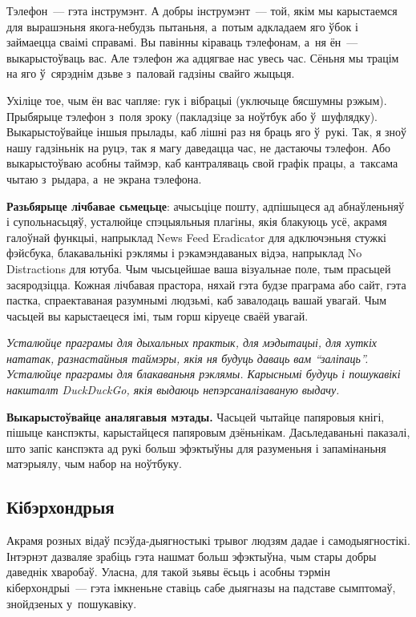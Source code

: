 
Тэлефон~--- гэта інструмэнт. А добры інструмэнт~--- той, якім мы карыстаемся для вырашэньня якога-небудзь пытаньня, а~потым адкладаем яго ўбок і займаецца сваімі справамі. Вы павінны кіраваць тэлефонам, а~ня ён~--- выкарыстоўваць вас. Але тэлефон жа адцягвае нас увесь час. Сёньня мы трацім на яго ў~сярэднім дзьве з~паловай гадзіны свайго жыцьця.

Ухіліце тое, чым ён вас чапляе: гук і вібрацыі (уключыце бясшумны рэжым). Прыбярыце тэлефон з~поля зроку (пакладзіце за ноўтбук або ў~шуфлядку). Выкарыстоўвайце іншыя прылады, каб лішні раз ня браць яго ў~рукі. Так, я зноў нашу гадзіньнік на руцэ, так я магу даведацца час, не дастаючы тэлефон. Або выкарыстоўваю асобны таймэр, каб кантраляваць свой графік працы, а~таксама чытаю з~рыдара, а~не экрана тэлефона.

\textbf{Разьбярыце лічбавае сьмецьце}: ачысьціце пошту, адпішыцеся ад абнаўленьняў і супольнасьцяў, усталюйце спэцыяльныя плагіны, якія блакуюць усё, акрамя галоўнай функцыі, напрыклад News Feed Eradicator для адключэньня стужкі фэйсбука, блакавальнікі рэклямы і рэкамэндаваных відэа, напрыклад No Distractions для ютуба. Чым чысьцейшае ваша візуальнае поле, тым прасьцей засяродзіцца. Кожная лічбавая прастора, няхай гэта будзе праграма або сайт, гэта пастка, спраектаваная разумнымі людзьмі, каб завалодаць вашай увагай. Чым часьцей вы карыстаецеся імі, тым горш кіруеце сваёй увагай.

\emph{Усталюйце праграмы для дыхальных практык, для мэдытацыі, для хуткіх нататак, разнастайныя таймэры, якія ня будуць даваць вам ``заліпаць''. Усталюйце праграмы для блакаваньня рэклямы. Карыснымі будуць і пошукавікі накшталт DuckDuckGo, якія выдаюць непэрсаналізаваную выдачу.}

\textbf{Выкарыстоўвайце аналягавыя мэтады.} Часьцей чытайце папяровыя кнігі, пішыце канспэкты, карыстайцеся папяровым дзёньнікам. Дасьледаваньні паказалі, што запіс канспэкта ад рукі больш эфэктыўны для разуменьня і запамінаньня матэрыялу, чым набор на ноўтбуку.

\subsection*{Кібэрхондрыя}

Акрамя розных відаў псэўда-дыягностыкі трывог людзям дадае і самодыягностікі. Інтэрнэт дазваляе зрабіць гэта нашмат больш эфэктыўна, чым стары добры даведнік хваробаў. Уласна, для такой зьявы ёсьць і асобны тэрмін кіберхондрыі~--- гэта імкненьне ставіць сабе дыягназы на падставе сымптомаў, знойдзеных у~пошукавіку.


